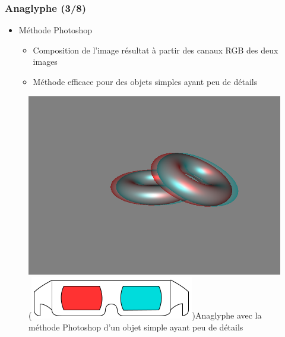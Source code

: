 \documentclass{beamer}
\begin{document}
%
\begin{frame}
\frametitle{Anaglyphe (3/8)}
\begin{itemize}[label=$\bullet$]
\item Méthode Photoshop \cite{stereoAnaglyph}
	\begin{itemize}[label=$\circ$]
	\item Composition de l'image résultat à partir des canaux RGB des deux images
	\item Méthode efficace pour des objets simples ayant peu de détails
	\end{itemize}
\end{itemize}
\begin{figure}
\centering
\includegraphics[scale=0.28]{donuts_photoshop.png}
\caption{(\includegraphics[scale=0.1]{lunettes.png})Anaglyphe avec la méthode Photoshop d'un objet simple ayant peu de détails }
\end{figure}


\end{frame}
\end{document}

